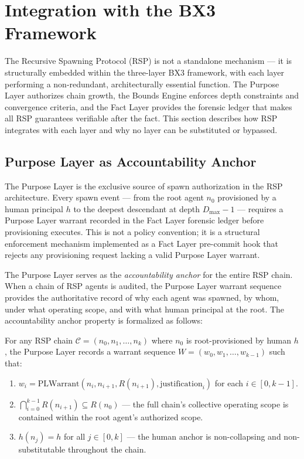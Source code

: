 \section{Integration with the BX3 Framework}
\label{sec:rs-bx3-integration}

The Recursive Spawning Protocol (RSP) is not a standalone mechanism — it is structurally embedded within the three-layer BX3 framework, with each layer performing a non-redundant, architecturally essential function. The Purpose Layer authorizes chain growth, the Bounds Engine enforces depth constraints and convergence criteria, and the Fact Layer provides the forensic ledger that makes all RSP guarantees verifiable after the fact. This section describes how RSP integrates with each layer and why no layer can be substituted or bypassed.

\subsection{Purpose Layer as Accountability Anchor}
\label{sec:rs-purpose-layer}

The Purpose Layer is the exclusive source of spawn authorization in the RSP architecture. Every spawn event — from the root agent $n_0$ provisioned by a human principal $h$ to the deepest descendant at depth $D_{\max}-1$ — requires a Purpose Layer warrant recorded in the Fact Layer forensic ledger before provisioning executes. This is not a policy convention; it is a structural enforcement mechanism implemented as a Fact Layer pre-commit hook that rejects any provisioning request lacking a valid Purpose Layer warrant.

The Purpose Layer serves as the \textit{accountability anchor} for the entire RSP chain. When a chain of RSP agents is audited, the Purpose Layer warrant sequence provides the authoritative record of why each agent was spawned, by whom, under what operating scope, and with what human principal at the root. The accountability anchor property is formalized as follows:

\begin{property}
\label{prop:purpose-anchor}
For any RSP chain $\mathcal{C} = (n_0, n_1, \ldots, n_k)$ where $n_0$ is root-provisioned by human $h$, the Purpose Layer records a warrant sequence $W = (w_0, w_1, \ldots, w_{k-1})$ such that:
\begin{enumerate}
    \item[(PA1)] $w_i = \text{PLWarrant}(n_i, n_{i+1}, R(n_{i+1}), \text{justification}_i)$ for each $i \in [0, k-1]$.
    \item[(PA2)] $\bigcap_{i=0}^{k-1} R(n_{i+1}) \subseteq R(n_0)$ — the full chain's collective operating scope is contained within the root agent's authorized scope.
    \item[(PA3)] $h(n_j) = h$ for all $j \in [0, k]$ — the human anchor is non-collapsing and non-substitutable throughout the chain.
\end{enumerate}
\end{property}

